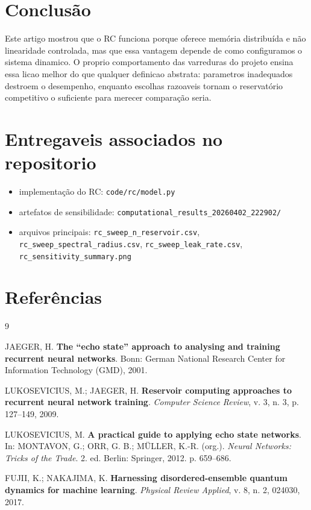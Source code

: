 \documentclass[12pt]{article}
\providecommand{\tightlist}{%
              \setlength{\itemsep}{0pt}\setlength{\parskip}{0pt}}
\begin{document}
\section{Conclusão}\label{10-conclusuxe3o}

Este artigo mostrou que o RC funciona porque oferece memória distribuída e não linearidade controlada, mas que essa vantagem depende de como configuramos o sistema dinamico. O proprio comportamento das varreduras do projeto ensina essa licao melhor do que qualquer definicao abstrata: parametros inadequados destroem o desempenho, enquanto escolhas razoaveis tornam o reservatório competitivo o suficiente para merecer comparação seria.

\section*{Entregaveis associados no repositorio}\label{entregaveis-associados-no-repositorio}

\begin{itemize}
\tightlist
\item
  implementação do RC: \texttt{code/rc/model.py}
\item
  artefatos de sensibilidade: \texttt{computational\_results\_20260402\_222902/}
\item
  arquivos principais: \texttt{rc\_sweep\_n\_reservoir.csv}, \texttt{rc\_sweep\_spectral\_radius.csv}, \texttt{rc\_sweep\_leak\_rate.csv}, \texttt{rc\_sensitivity\_summary.png}
\end{itemize}

\section{Referências}\label{referencias}

\begin{thebibliography}{9}

JAEGER, H. \textbf{The ``echo state'' approach to analysing and training recurrent neural networks}. Bonn: German National Research Center for Information Technology (GMD), 2001.

LUKOSEVICIUS, M.; JAEGER, H. \textbf{Reservoir computing approaches to recurrent neural network training}. \emph{Computer Science Review}, v. 3, n. 3, p. 127--149, 2009.

LUKOSEVICIUS, M. \textbf{A practical guide to applying echo state networks}. In: MONTAVON, G.; ORR, G. B.; MÜLLER, K.-R. (org.). \emph{Neural Networks: Tricks of the Trade}. 2. ed. Berlin: Springer, 2012. p. 659--686.

FUJII, K.; NAKAJIMA, K. \textbf{Harnessing disordered-ensemble quantum dynamics for machine learning}. \emph{Physical Review Applied}, v. 8, n. 2, 024030, 2017.

\end{thebibliography}

            
\end{document}
